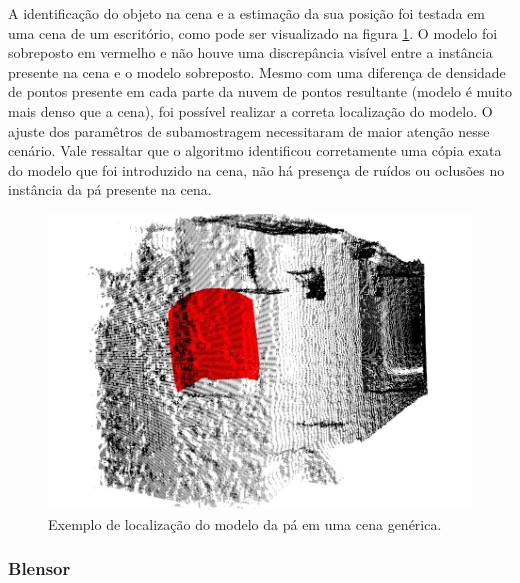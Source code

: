 A identificação do objeto na cena e a estimação da sua posição foi testada em
uma cena de um escritório, como pode ser visualizado na figura
\ref{fig::pa_cena_gen}. O modelo foi sobreposto em vermelho e não houve uma
discrepância visível entre a instância presente na cena e o modelo sobreposto. 
Mesmo com uma diferença de densidade de pontos presente em cada parte da nuvem
de pontos resultante (modelo é muito mais denso que a cena), foi possível
realizar a correta localização do modelo. O ajuste dos paramêtros de
subamostragem necessitaram de maior atenção nesse cenário. Vale ressaltar que o
algoritmo identificou corretamente uma cópia exata do modelo que foi introduzido
na cena, não há presença de ruídos ou oclusões no instância da pá presente na
cena.

\begin{figure}[h!]
	\centering
	\includegraphics[width=0.9\columnwidth]{figs/calibracao/blade_office5}
	\caption{Exemplo de localização do modelo da pá em uma cena genérica.}
    \label{fig::pa_cena_gen}
\end{figure}

\subsubsection{Blensor}


